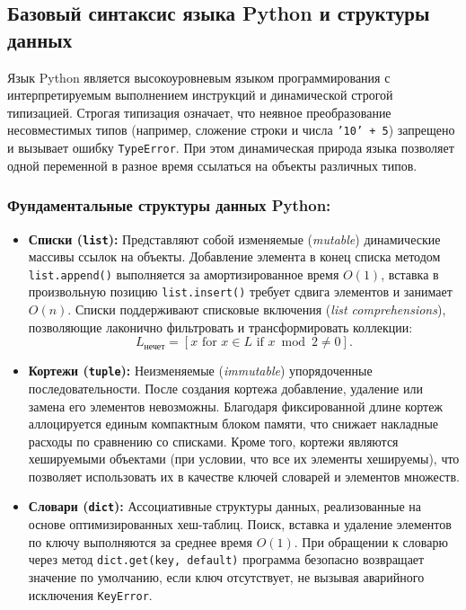 \documentclass[14pt,a4paper]{extarticle}
\begin{document}
\subsection{Базовый синтаксис языка Python и структуры данных}

Язык Python является высокоуровневым языком программирования с интерпретируемым выполнением инструкций и динамической строгой типизацией. Строгая типизация означает, что неявное преобразование несовместимых типов (например, сложение строки и числа \texttt{'10' + 5}) запрещено и вызывает ошибку \texttt{TypeError}. При этом динамическая природа языка позволяет одной переменной в разное время ссылаться на объекты различных типов.

\subsubsection{Фундаментальные структуры данных Python:}
\begin{itemize}
    \item \textbf{Списки (\texttt{list}):} Представляют собой изменяемые (\textit{mutable}) динамические массивы ссылок на объекты. Добавление элемента в конец списка методом \texttt{list.append()} выполняется за амортизированное время $O(1)$, вставка в произвольную позицию \texttt{list.insert()} требует сдвига элементов и занимает $O(n)$. Списки поддерживают списковые включения (\textit{list comprehensions}), позволяющие лаконично фильтровать и трансформировать коллекции:
    \begin{equation}
        L_{\text{нечет}} = [x \text{ for } x \in L \text{ if } x \bmod 2 \neq 0].
    \end{equation}
    \item \textbf{Кортежи (\texttt{tuple}):} Неизменяемые (\textit{immutable}) упорядоченные последовательности. После создания кортежа добавление, удаление или замена его элементов невозможны. Благодаря фиксированной длине кортеж аллоцируется единым компактным блоком памяти, что снижает накладные расходы по сравнению со списками. Кроме того, кортежи являются хешируемыми объектами (при условии, что все их элементы хешируемы), что позволяет использовать их в качестве ключей словарей и элементов множеств.
    \item \textbf{Словари (\texttt{dict}):} Ассоциативные структуры данных, реализованные на основе оптимизированных хеш-таблиц. Поиск, вставка и удаление элементов по ключу выполняются за среднее время $O(1)$. При обращении к словарю через метод \texttt{dict.get(key, default)} программа безопасно возвращает значение по умолчанию, если ключ отсутствует, не вызывая аварийного исключения \texttt{KeyError}.
\end{itemize}
\end{document}

